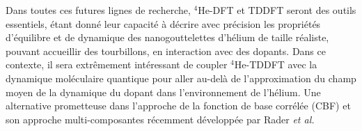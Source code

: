 		Dans toutes ces futures lignes de recherche, $^4$He-DFT et TDDFT seront des outils essentiels, étant donné leur capacité à décrire avec précision les propriétés d'équilibre et de dynamique des nanogouttelettes d'hélium de taille réaliste, pouvant accueillir des tourbillons, en interaction avec des dopants. Dans ce contexte, il sera extrêmement intéressant de coupler $^4$He-TDDFT avec la dynamique moléculaire quantique pour aller au-delà de l'approximation du champ moyen de la dynamique du dopant dans l'environnement de l'hélium. Une alternative prometteuse dans l'approche de la fonction de base corrélée (CBF) et son approche multi-composantes récemment développée par Rader \textit{et al.}
		
		\vspace{25ex}
		\filleft{\bfseries\itshape\fontsize{50}{60}\selectfont\textcolor{activeColor}{Fin}}